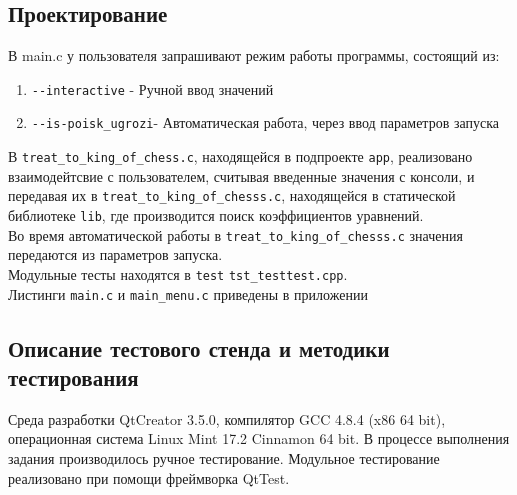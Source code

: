 \documentclass[12pt,a4paper]{report}
\begin{document}
\subsection{Проектирование}
В main.c у пользователя запрашивают режим работы программы, состоящий из:
\begin{enumerate}
\item \verb+--interactive+ - Ручной ввод значений
\item \verb+--is-poisk_ugrozi+- Автоматическая работа, через ввод параметров запуска
\end{enumerate}

В \verb+treat_to_king_of_chess.c+, находящейся в подпроекте \verb+app+,  реализовано взаимодейтсвие с пользователем, считывая введенные значения с консоли, и передавая их в \verb+treat_to_king_of_chesss.c+, находящейся в статической библиотеке \verb+lib+, где производится поиск коэффициентов уравнений.\\
Во время автоматической работы в \verb+treat_to_king_of_chesss.c+ значения передаются из параметров запуска.\\
Модульные тесты находятся в \verb+test+ \verb+tst_testtest.cpp+.\\
Листинги \verb+main.c+ и \verb+main_menu.c+ приведены в приложении

\subsection{Описание тестового стенда и методики тестирования}
Среда разработки QtCreator 3.5.0, компилятор GCC 4.8.4 (x86 64 bit), операционная система Linux Mint 17.2 Cinnamon 64 bit.
В процессе выполнения задания производилось ручное тестирование.
Модульное тестирование реализовано при помощи фреймворка QtTest.
\end{document}
